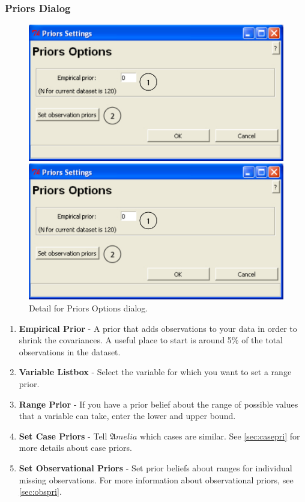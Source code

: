 \documentclass[12pt,titlepage]{article}
\begin{document}
\subsubsection{Priors Dialog}
\label{sec:pridiag}
\begin{figure}[ht]
 \begin{htmlonly} 
  \centering \includegraphics[scale=1]{priors} 
 \end{htmlonly}
 \begin{latexonly}
  \centering \includegraphics[scale=.75]{priors}
 \end{latexonly}
  \caption{Detail for Priors Options dialog.}
\end{figure}
\begin{enumerate}
\item \textbf{Empirical Prior} - A prior that adds observations to
  your data in order to shrink the covariances.  A useful place to
  start is around 5\% of the total observations in the dataset.
\item \textbf{Variable Listbox} - Select the variable for which you
  want to set a range prior.
\item \textbf{Range Prior} - If you
  have a prior belief about the range of possible values that a
  variable can take, enter the lower and upper bound.
\item \textbf{Set Case Priors} -
  Tell ${\mathfrak Amelia}$ which cases are similar.  See
  \ref{sec:casepri} for more details about case priors.
\item \textbf{Set Observational Priors} - Set prior beliefs about 
 ranges for individual missing observations.  For more information 
 about observational priors, see \ref{sec:obspri}.
\end{enumerate}
\end{document}
